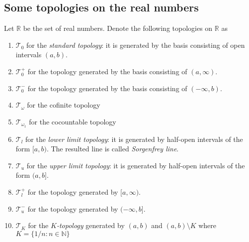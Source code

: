 \documentclass{treatise}
\begin{document}
\subsection{Some topologies on the real numbers}
Let $\mathbb{R}$ be the set of real numbers. Denote the following topologies on $\mathbb{R}$ as
\begin{enumerate}
    \item $\mathcal{T}_0$ for the \emph{standard topology}: it is generated by the basis consisting of open intervals $(a, b)$.
    \item $\mathcal{T}_0^+$ for the topology generated by the basis consisting of $(a, \infty)$.
    \item $\mathcal{T}_0^-$ for the topology generated by the basis consisting of $(-\infty, b)$.
    \item $\mathcal{T}_\omega$ for the cofinite topology
    \item $\mathcal{T}_{\omega_1}$ for the cocountable topology
    \item $\mathcal{T}_l$ for the \emph{lower limit topology}: it is generated by half-open intervals of the form $[a, b)$. The resulted line is called \emph{Sorgenfrey line}.
    \item $\mathcal{T}_u$ for the \emph{upper limit topology}: it is generated by half-open intervals of the form $(a, b]$.
    \item $\mathcal{T}_l^+$ for the topology generated by $[a, \infty)$.
    \item $\mathcal{T}_u^-$ for the topology generated by $(-\infty, b]$.
    \item $\mathcal{T}_K$ for the \emph{$K$-topology} generated by $(a, b)$ and $(a, b) \setminus K$ where $K = \{ 1/n : n \in \mathbb{N} \}$
\end{enumerate}
\end{document}

